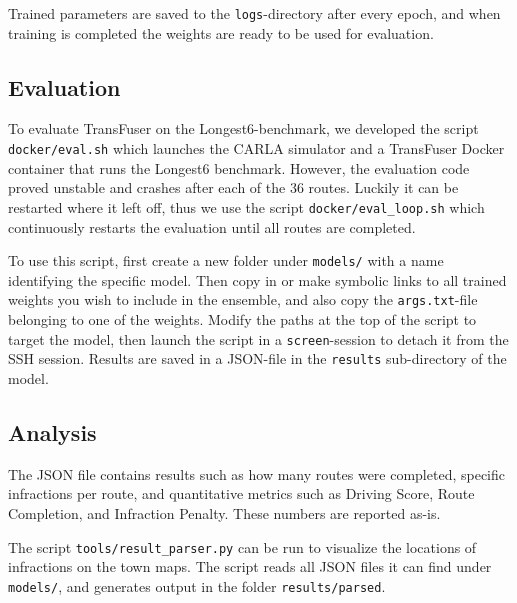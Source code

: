 Trained parameters are saved to the \texttt{logs}-directory after every epoch,
and when training is completed the weights are ready to be used for evaluation.

\subsection{Evaluation}
\label{app:sec:evaluation}

To evaluate TransFuser on the Longest6-benchmark,
we developed the script \texttt{docker/eval.sh}
which launches the CARLA simulator and a TransFuser Docker container that runs the Longest6 benchmark.
However, the evaluation code proved unstable and crashes after each of the 36 routes.
Luckily it can be restarted where it left off,
thus we use the script \texttt{docker/eval\_loop.sh}
which continuously restarts the evaluation until all routes are completed.

To use this script,
first create a new folder under \texttt{models/} with a name identifying the specific model.
Then copy in or make symbolic links to all trained weights you wish to include in the ensemble,
and also copy the \texttt{args.txt}-file belonging to one of the weights.
Modify the paths at the top of the script to target the model,
then launch the script in a \texttt{screen}-session to detach it from the SSH session.
Results are saved in a JSON-file in the \texttt{results} sub-directory of the model.

\subsection{Analysis}

The JSON file contains results such as
how many routes were completed,
specific infractions per route,
and quantitative metrics such as Driving Score, Route Completion, and Infraction Penalty.
These numbers are reported as-is.

The script \texttt{tools/result\_parser.py} can be run to visualize 
the locations of infractions on the town maps.
The script reads all JSON files it can find under \texttt{models/},
and generates output in the folder \texttt{results/parsed}.


